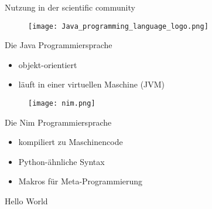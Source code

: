 \documentclass[aspectratio=169]{beamer}
\begin{document}
\begin{frame}{Nutzung in der scientific community}
\end{frame}

\begin{frame}{}
  \begin{figure}
    \centering
    \texttt{[image: Java\_programming\_language\_logo.png]}
    \caption{\cite{java_logo}}
    \label{fig:java_logo}
  \end{figure}
\end{frame}

\begin{frame}{Die Java Programmiersprache}
  \begin{itemize}
  \item objekt-orientiert
  \item läuft in einer virtuellen Maschine (JVM)
  \end{itemize}
\end{frame}

\begin{frame}{}
  \begin{figure}
    \centering
    \texttt{[image: nim.png]}
    \caption{\cite{nim_logo}}
    \label{fig:nim_logo}
  \end{figure}
\end{frame}

\begin{frame}{Die Nim Programmiersprache}
  \begin{itemize}
  \item kompiliert zu Maschinencode
  \item Python-ähnliche Syntax
  \item Makros für Meta-Programmierung
  \end{itemize}
\end{frame}

\begin{frame}{Hello World}
  \inputminted[linenos]{nim}{examples/hello.nim}
\end{frame}
\end{document}
